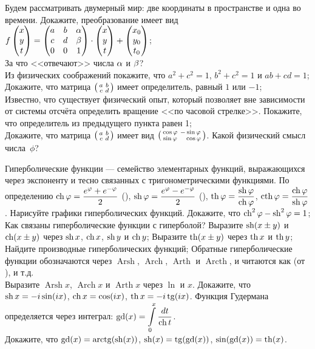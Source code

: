 \documentclass[a4paper,11pt]{article}
\newcommand{\smat}[1]{\hr{\begin{smallmatrix}#1\end{smallmatrix}}}
\newcommand{\мв}{\,м$_в$}
\DeclareMathOperator{\Arsh}{Arsh}
\DeclareMathOperator{\Arch}{Arch}
\DeclareMathOperator{\Arth}{Arth}
\DeclareMathOperator{\Arcth}{Arcth}
\DeclareMathOperator{\gd}{gd}
\begin{document}
\label{3dworld}
Будем рассматривать двумерный мир: две координаты в пространстве и одна во времени.
Докажите, преобразование имеет вид $f\begin{pmatrix}x\\y\\t\end{pmatrix} = \begin{pmatrix}a&b&\alpha\\c&d&\beta\\0&0&1\end{pmatrix}\cdot\begin{pmatrix}x\\y\\t\end{pmatrix}+\begin{pmatrix}x_0\\y_0\\t_0\end{pmatrix}$;
\\
За что <<отвечают>> числа $\alpha$ и $\beta$?
\\
Из физических соображений покажите, что
$a^2+c^2=1$,  $b^2+c^2=1$ и $ab+cd=1$;
\\
Докажите, что матрица $\smat{a&b\\c&d}$ имеет определитель, равный $1$ или $-1$;
\\
Известно, что существует  физический опыт, который позволяет вне зависимости от системы отсчёта определить вращение <<по часовой стрелке>>.
Покажите, что определитель из предыдущего пункта равен 1;
\\
Докажите, что матрица $\smat{a&b\\c&d}$ имеет вид $\smat{\cos\phi&-\sin\phi\\\sin\phi&\phantom{-}\cos\phi}$.
Какой физический смысл числа~$\phi$?

Гиперболические функции — семейство элементарных функций, выражающихся через экспоненту и тесно связанных с тригонометрическими функциями.
По определению $\ch \ph = \dfrac{e^\ph + e^{-\ph}}{2}$ (), $\sh \ph = \dfrac{e^\ph - e^{-\ph}}{2}$ (), $\th\ph = \dfrac{\sh\ph}{\ch\ph}$, $\cth{\ph}=\dfrac{\ch\ph}{\sh\ph}$.
Нарисуйте графики гиперболических функций.
Докажите, что $\ch^2\ph - \sh^2\ph = 1$;
Как связаны гиперболические функции с гиперболой?
Выразите $\sh(x\pm y)$ и $\ch(x\pm y)$ через $\sh x$, $\ch x$, $\sh y$ и $\ch y$;
 Выразите $\th(x\pm y)$ через $\th x$ и $\th y$;
Найдите производные гиперболических функций;
Обратные гиперболические функции обозначаются через $\Arsh$, $\Arch$, $\Arth$ и $\Arcth$,
и читаются как  (от ),  и т.д.
\\Выразите $\Arsh x$, $\Arch x$ и $\Arth x$ через $\ln$ и $x$.
Докажите, что $\sh x = -i\sin(ix)$, $\ch x = \cos(ix)$, $\th x = -i\tg(ix)$.
\vspace*{-3mm}
Функция  Гудермана определяется через интеграл: $\displaystyle\gd(x)=\int\limits_0^x \dfrac{dt}{\ch t}$.
\vspace*{-3mm}
\\Докажите, что $\gd(x) = \arctg(\sh(x))$, $\sh(x)=\tg(\gd(x))$, $\sin(\gd(x))=\th(x)$.
\end{document}
